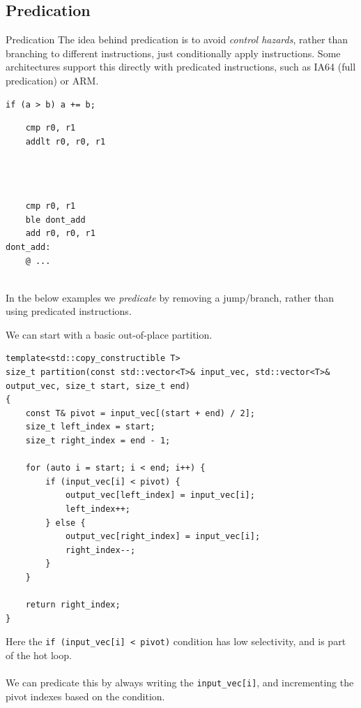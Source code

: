 \subsection{Predication}
\label{section:predication}
\begin{sidenotebox}{Predication}
    The idea behind predication is to avoid \textit{control hazards}, rather than branching to different instructions, just conditionally apply instructions.
    Some architectures support this directly with predicated instructions, such as IA64 (full predication) or ARM.
    \begin{verbatim}
if (a > b) a += b;
    \end{verbatim}
    \begin{minipage}[t]{.3\textwidth}
        \begin{verbatim}
    cmp r0, r1
    addlt r0, r0, r1


    
        \end{verbatim}
    \end{minipage} \begin{minipage}[t]{.3\textwidth}
        \begin{verbatim}
    cmp r0, r1
    ble dont_add 
    add r0, r0, r1
dont_add:
    @ ...
        \end{verbatim}
    \end{minipage}
    \\ In the below examples we \textit{predicate} by removing a jump/branch, rather than using predicated instructions.
\end{sidenotebox}
We can start with a basic out-of-place partition.
\begin{verbatim}
template<std::copy_constructible T>
size_t partition(const std::vector<T>& input_vec, std::vector<T>& output_vec, size_t start, size_t end)
{
    const T& pivot = input_vec[(start + end) / 2];  
    size_t left_index = start;
    size_t right_index = end - 1;

    for (auto i = start; i < end; i++) {
        if (input_vec[i] < pivot) {
            output_vec[left_index] = input_vec[i];
            left_index++;
        } else {
            output_vec[right_index] = input_vec[i];
            right_index--;
        }
    }

    return right_index;
}
\end{verbatim}
Here the \texttt{if (input_vec[i] < pivot)} condition has low selectivity, and is part of the hot loop.
\\
\\ We can predicate this by always writing the \texttt{input_vec[i]}, and incrementing the pivot indexes based on the condition.
